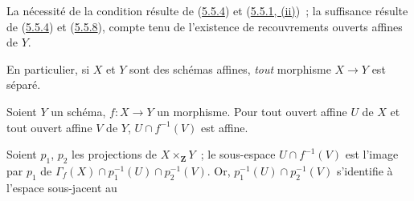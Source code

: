 La nécessité de la condition résulte de
(\hyperref[I.5.5.4-fr]{5.5.4}) et
(\hyperref[I.5.5.1-fr]{5.5.1, (ii)})~; la suffisance résulte de
(\hyperref[I.5.5.4-fr]{5.5.4}) et
(\hyperref[I.5.5.8-fr]{5.5.8}), compte tenu de l'existence de recouvrements
ouverts affines de $Y$.

En particulier, si $X$ et $Y$ sont des schémas affines, \emph{tout} morphisme
$X\to Y$ est séparé.

\begin{proposition}[5.5.10]
\label{I.5.5.10-fr}
Soient $Y$ un schéma, $f:X\to Y$ un morphisme. Pour tout ouvert affine $U$ de
$X$ et tout ouvert affine $V$ de $Y$, $U\cap f^{-1}(V)$ est affine.
\end{proposition}

Soient $p_1$, $p_2$ les projections de $X\times_{\mathbf{Z}}Y$~; le
sous-espace $U\cap f^{-1}(V)$ est l'image par $p_1$ de
$\Gamma_f(X)\cap p_1^{-1}(U)\cap p_2^{-1}(V)$. Or,
$p_1^{-1}(U)\cap p_2^{-1}(V)$ s'identifie à l'espace sous-jacent au

